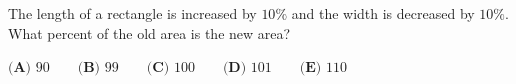 The length of a rectangle is increased by $10\%$ and the width is decreased by $10\%$. What percent of the old area is the new area?

$\textbf{(A) }90\qquad\textbf{(B) }99\qquad\textbf{(C) }100\qquad\textbf{(D) }101\qquad\textbf{(E) }110$
